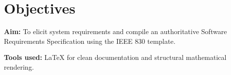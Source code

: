 \section{Objectives}
\textbf{Aim:} To elicit system requirements and compile an authoritative Software Requirements Specification using the IEEE 830 template.

\textbf{Tools used:} \LaTeX{} for clean documentation and structural mathematical rendering.
